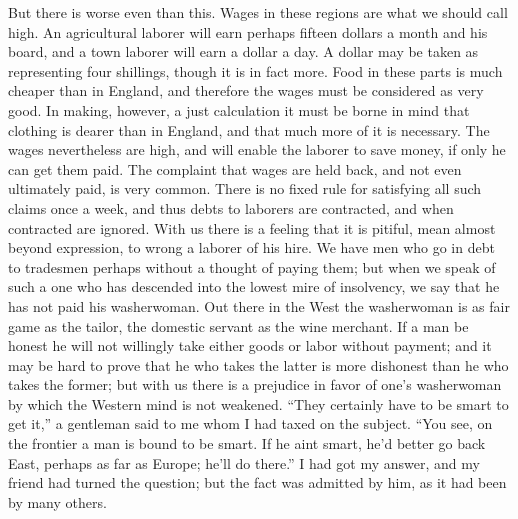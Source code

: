 But there is worse even than this.  Wages in these regions are what
we should call high.  An agricultural laborer will earn perhaps
fifteen dollars a month and his board, and a town laborer will earn
a dollar a day.  A dollar may be taken as representing four
shillings, though it is in fact more.  Food in these parts is much
cheaper than in England, and therefore the wages must be considered
as very good.  In making, however, a just calculation it must be
borne in mind that clothing is dearer than in England, and that
much more of it is necessary.  The wages nevertheless are high, and
will enable the laborer to save money, if only he can get them
paid.  The complaint that wages are held back, and not even
ultimately paid, is very common.  There is no fixed rule for
satisfying all such claims once a week, and thus debts to laborers
are contracted, and when contracted are ignored.  With us there is
a feeling that it is pitiful, mean almost beyond expression, to
wrong a laborer of his hire.  We have men who go in debt to
tradesmen perhaps without a thought of paying them; but when we
speak of such a one who has descended into the lowest mire of
insolvency, we say that he has not paid his washerwoman.  Out there
in the West the washerwoman is as fair game as the tailor, the
domestic servant as the wine merchant.  If a man be honest he will
not willingly take either goods or labor without payment; and it
may be hard to prove that he who takes the latter is more dishonest
than he who takes the former; but with us there is a prejudice in
favor of one's washerwoman by which the Western mind is not
weakened.  ``They certainly have to be smart to get it,'' a gentleman
said to me whom I had taxed on the subject.  ``You see, on the
frontier a man is bound to be smart.  If he aint smart, he'd better
go back East, perhaps as far as Europe; he'll do there.''  I had got
my answer, and my friend had turned the question; but the fact was
admitted by him, as it had been by many others.

